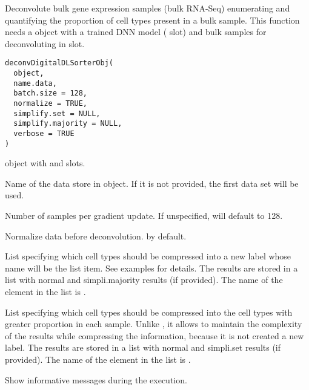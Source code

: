 \documentclass[a4paper]{book}
\begin{document}
%
\begin{Description}\relax
Deconvolute bulk gene expression samples (bulk RNA-Seq) enumerating and
quantifying the proportion of cell types present in a bulk sample. This
function needs a  object with a trained DNN model
( slot) and bulk samples for deconvoluting in
 slot.
\end{Description}
%
\begin{Usage}
\begin{verbatim}
deconvDigitalDLSorterObj(
  object,
  name.data,
  batch.size = 128,
  normalize = TRUE,
  simplify.set = NULL,
  simplify.majority = NULL,
  verbose = TRUE
)
\end{verbatim}
\end{Usage}
%
\begin{Arguments}
\begin{ldescription}
\item[\code{object}]  object with 
and  slots.

\item[\code{name.data}] Name of the data store in  object. If
it is not provided, the first data set will be used.

\item[\code{batch.size}] Number of samples per gradient update. If unspecified,
 will default to 128.

\item[\code{normalize}] Normalize data before deconvolution.  by default.

\item[\code{simplify.set}] List specifying which cell types should be compressed
into a new label whose name will be the list item. See examples for
details. The results are stored in a list with normal and simpli.majority
results (if provided). The name of the element in the list is
.

\item[\code{simplify.majority}] List specifying which cell types should be
compressed into the cell types with greater proportion in each sample.
Unlike , it allows to maintain the complexity of the
results while compressing the information, because it is not created a new
label. The results are stored in a list with normal and simpli.set results
(if provided). The name of the element in the list is
.

\item[\code{verbose}] Show informative messages during the execution.
\end{ldescription}
\end{Arguments}
\end{document}

